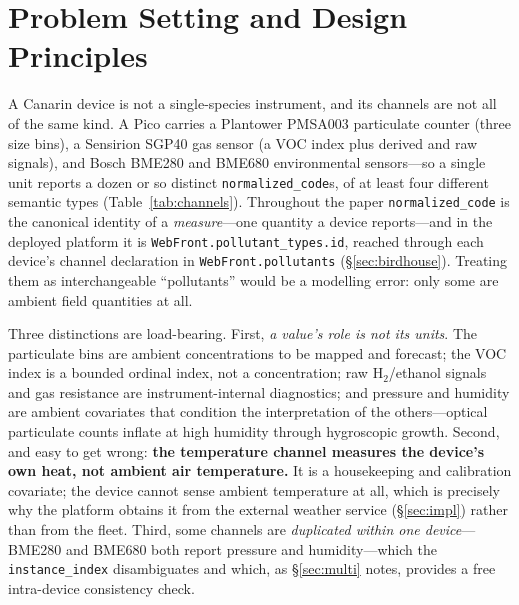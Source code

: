 \documentclass[10pt]{article}
\begin{document}
\section{Problem Setting and Design Principles}
\label{sec:setting}
A Canarin device is not a single-species instrument, and its channels are not all
of the same kind. A Pico carries a Plantower PMSA003 particulate counter
(three size bins), a Sensirion SGP40 gas sensor (a VOC index plus derived and raw
signals), and Bosch BME280 and BME680 environmental sensors---so a single unit
reports a dozen or so distinct \texttt{normalized\_code}s, of at least four
different semantic types (Table~\ref{tab:channels}). Throughout the paper
\texttt{normalized\_code} is the canonical identity of a \emph{measure}---one quantity a device
reports---and in the deployed platform it is \texttt{WebFront.pollutant\_types.id},
reached through each device's channel declaration in \texttt{WebFront.pollutants}
(\S\ref{sec:birdhouse}). Treating them as
interchangeable ``pollutants'' would be a modelling error: only some are ambient
field quantities at all.

Three distinctions are load-bearing. First, \emph{a value's role is not its
units}. The particulate bins are ambient concentrations to be mapped and
forecast; the VOC index is a bounded ordinal index, not a concentration; raw
$\mathrm{H_2}$/ethanol signals and gas resistance are instrument-internal
diagnostics; and pressure and humidity are ambient covariates that condition the
interpretation of the others---optical particulate counts inflate at high humidity
through hygroscopic growth. Second, and easy to get wrong: \textbf{the temperature
channel measures the device's own heat, not ambient air temperature.} It is a
housekeeping and calibration covariate; the device cannot sense ambient
temperature at all, which is precisely why the platform obtains it from the
external weather service (\S\ref{sec:impl}) rather than from the fleet. Third,
some channels are \emph{duplicated within one device}---BME280 and BME680 both
report pressure and humidity---which the \texttt{instance\_index} disambiguates
and which, as \S\ref{sec:multi} notes, provides a free intra-device consistency
check.
\end{document}
